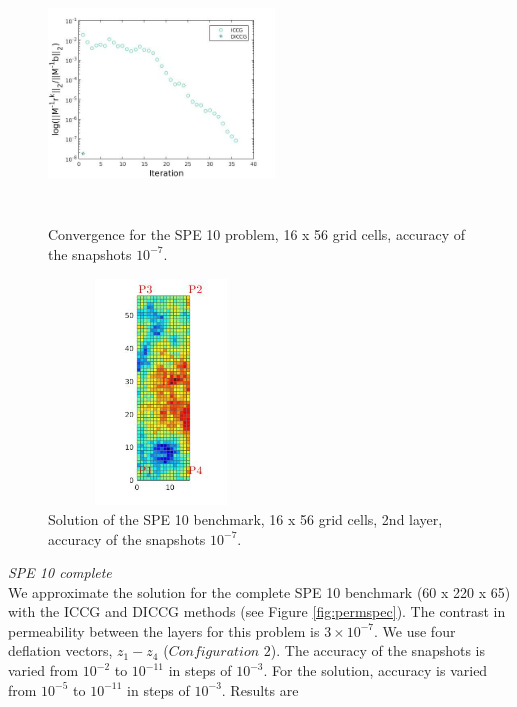 \documentclass{ecmorXV}
\begin{document}
\begin{figure}[!h]
\centering
\begin{minipage}{.5\textwidth}
 \centering
\includegraphics[width=6cm,height=6cm,keepaspectratio]
{conv_deftol-7_5_5.jpg}
\caption{Convergence for the SPE 10 problem, 16 x 56 grid cells, accuracy of the snapshots $10 ^{-7}$.}
\label{fig:convspe}
\end{minipage}%
\hspace{4mm}
\begin{minipage}{.45\textwidth}
 \centering
\includegraphics[width=6cm,height=6cm,keepaspectratio]
{sol1.jpg}
\caption{Solution of the SPE 10 benchmark, 16 x 56 grid cells, 2nd layer, accuracy of the snapshots $10 ^{-7}$.}
\label{fig:solspe}
\end{minipage}
\end{figure}
\newpage
\emph{SPE 10 complete}\\
We approximate the solution for the complete SPE 10 benchmark (60 x 220 x 65) with the ICCG and DICCG 
methods (see Figure \ref{fig:permspec}). The contrast in permeability between the layers for this problem is
$3 \times 10^{-7}$.
We use four deflation vectors, $z_1-z_4$ ($Configuration$ $2$).
The accuracy of the snapshots is varied from $10^{-2}$ to $10^{-11}$ in steps of $10^{-3}$. 
For the solution, accuracy is varied from $10^{-5}$ to $10^{-11}$ in steps of $10^{-3}$. Results are 
\end{document}
